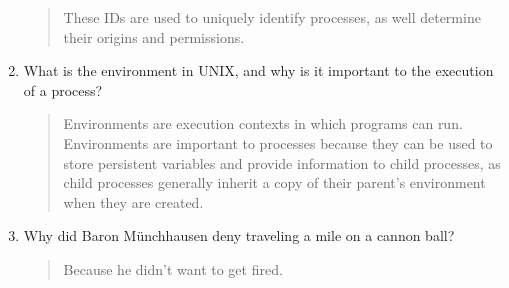 \documentclass[letterpaper,10pt,onecolumn,titlepage]{article}
\begin{document}
\begin{enumerate}[itemsep=0.1 in]
\begin{quote}
  These IDs are used to uniquely identify processes, as well determine their origins and permissions.
\end{quote}

\item What is the environment in UNIX, and why is it important to the execution of a
  process?

\begin{quote}
  Environments are execution contexts in which programs can run. Environments are important to processes because they can be used to store persistent variables and provide information to child processes, as child processes generally inherit a copy of their parent's environment when they are created.
\end{quote}


\item Why did Baron M\"unchhausen deny traveling a mile on a cannon ball? 

\begin{quote}
Because he didn't want to get fired.
\end{quote}


\end{enumerate}
\end{document}
